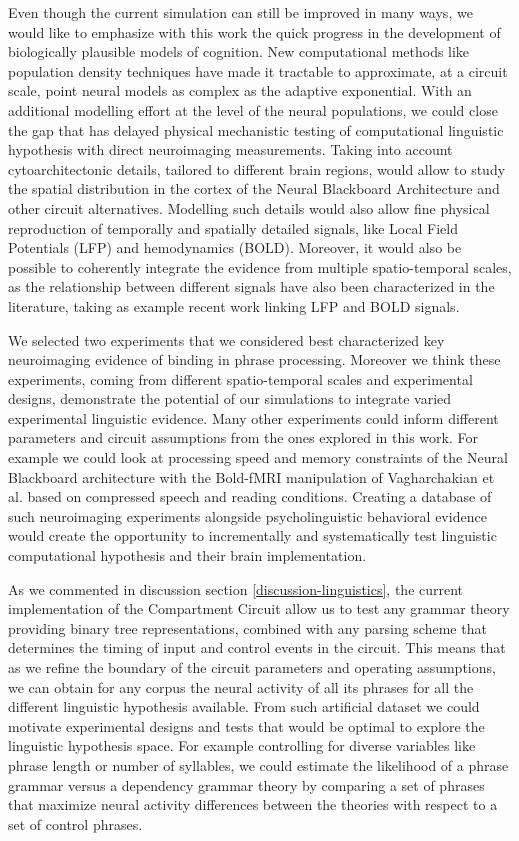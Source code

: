 \documentclass[10pt]{article}
\begin{document}
Even though the current simulation can still be improved in many ways, we would like to emphasize with this work the quick progress in the development of biologically plausible models of cognition.
New computational methods like population density techniques have made it tractable to approximate, at a circuit scale, point neural models as complex as the adaptive exponential.
With an additional modelling effort at the level of the neural populations, we could close the gap that has delayed physical mechanistic testing of computational linguistic hypothesis with direct neuroimaging measurements.
Taking into account cytoarchitectonic details, tailored to different brain regions, would allow to study the spatial distribution in the cortex of the Neural Blackboard Architecture and other circuit alternatives.
Modelling such details would also allow fine physical reproduction of temporally and spatially detailed signals, like Local Field Potentials (LFP)\cite{Mazzoni_2015,Hagen_2015} and hemodynamics (BOLD)\cite{Buxton_2004}.
Moreover, it would also be possible to coherently integrate the evidence from multiple spatio-temporal scales, as the relationship between different signals have also been characterized in the literature, taking as example recent work linking LFP and BOLD signals\cite{hermes2017neuronal}.

We selected two experiments that we considered best characterized key neuroimaging evidence of binding in phrase processing.
Moreover we think these experiments, coming from different spatio-temporal scales and experimental designs, demonstrate the potential of our simulations to integrate varied experimental linguistic evidence.
Many other experiments could inform different parameters and circuit assumptions from the ones explored in this work.
For example we could look at processing speed and memory constraints of the Neural Blackboard architecture with the Bold-fMRI manipulation of Vagharchakian et al.\cite{Vagharchakian_2012} based on compressed speech and reading conditions.
Creating a database of such neuroimaging experiments alongside psycholinguistic behavioral evidence would create the opportunity to incrementally and systematically test linguistic computational hypothesis and their brain implementation.

As we commented in discussion section \ref{discussion-linguistics}, the current implementation of the Compartment Circuit allow us to test any grammar theory providing binary tree representations, combined with any parsing scheme that determines the timing of input and control events in the circuit.
This means that as we refine the boundary of the circuit parameters and operating assumptions, we can obtain for any corpus the neural activity of all its phrases for all the different linguistic hypothesis available.
From such artificial dataset we could motivate experimental designs and tests that would be optimal to explore the linguistic hypothesis space.
For example controlling for diverse variables like phrase length or number of syllables, we could estimate the likelihood of a phrase grammar versus a dependency grammar theory by comparing a set of phrases that maximize neural activity differences between the theories with respect to a set of control phrases.
\end{document}
